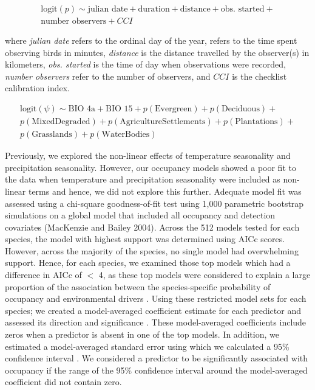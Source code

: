 \begin{multline*}
    \text{logit}(p) \sim \text{julian date} + \text{duration} + \text{distance} + \text{obs. started} + \\
    \text{number observers} + CCI    
\end{multline*}

where \textit{julian date} refers to the ordinal day of the year,  refers to the time spent observing birds in minutes, \textit{distance} is the distance travelled by the observer(s) in kilometers, \textit{obs. started} is the time of day when observations were recorded, \textit{number observers} refer to the number of observers, and $CCI$ is the checklist calibration index.

\begin{multline*}
    \text{logit}(\psi) \sim \text{BIO 4a} + \text{BIO 15} + p(\text{Evergreen}) + p(\text{Deciduous}) + \\
    p(\text{MixedDegraded}) + p(\text{AgricultureSettlements}) + p(\text{Plantations}) + \\
    p(\text{Grasslands}) + p(\text{WaterBodies})
\end{multline*}

Previously, we explored the non-linear effects of temperature seasonality and precipitation seasonality.
However, our occupancy models showed a poor fit to the data when temperature and precipitation seasonality were included as non-linear terms and hence, we did not explore this further.
Adequate model fit was assessed using a chi-square goodness-of-fit test using 1,000 parametric bootstrap simulations on a global model that included all occupancy and detection covariates (MacKenzie and Bailey 2004).
Across the 512 models tested for each species, the model with highest support was determined using AICc scores.
However, across the majority of the species, no single model had overwhelming support.
Hence, for each species, we examined those top models which had a difference in AICc of $<$ 4, as these top models were considered to explain a large proportion of the association between the species-specific probability of occupancy and environmental drivers \citep{burnham2011}.
Using these restricted model sets for each species; we created a model-averaged coefficient estimate for each predictor and assessed its direction and significance \citep{barton2009}.
These model-averaged coefficients include zeros when a predictor is absent in one of the top models.
In addition, we estimated a model-averaged standard error using which we calculated a 95\% confidence interval \citep{burnham2002}.
We considered a predictor to be significantly associated with occupancy if the range of the 95\% confidence interval around the model-averaged coefficient did not contain zero.

